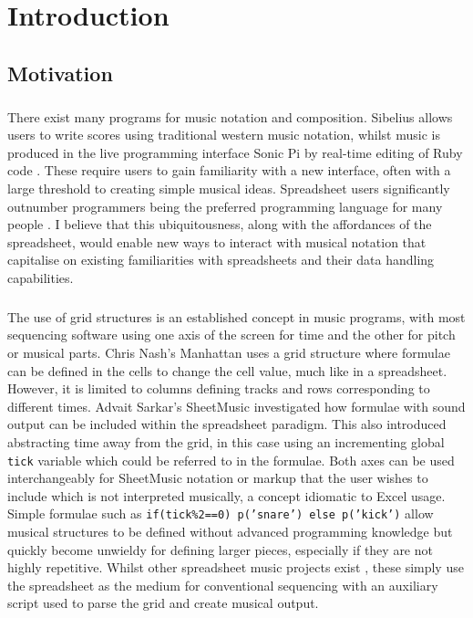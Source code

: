 
\chapter{Introduction}

\section{Motivation}

\paragraph{} There exist many programs for music notation and composition. Sibelius allows users to write scores using traditional western music notation, whilst music is produced in the live programming interface Sonic Pi by real-time editing of Ruby code \cite{aaron:pi}. These require users to gain familiarity with a new interface, often with a large threshold to creating simple musical ideas. Spreadsheet users significantly outnumber programmers \cite{scaffidi:estimating} being the preferred programming language for many people \cite{blackwell:functions}. I believe that this ubiquitousness, along with the affordances of the spreadsheet, would enable new ways to interact with musical notation that capitalise on existing familiarities with spreadsheets and their data handling capabilities.

\paragraph{} The use of grid structures is an established concept in music programs, with most sequencing software using one axis of the screen for time and the other for pitch or musical parts. Chris Nash's Manhattan \cite{nash:manhattan} uses a grid structure where formulae can be defined in the cells to change the cell value, much like in a spreadsheet. However, it is limited to columns defining tracks and rows corresponding to different times. Advait Sarkar's SheetMusic \cite{sarkar:sheetmusic} investigated how formulae with sound output can be included within the spreadsheet paradigm. This also introduced abstracting time away from the grid, in this case using an incrementing global \texttt{tick} variable which could be referred to in the formulae. Both axes can be used interchangeably for SheetMusic notation or markup that the user wishes to include which is not interpreted musically, a concept idiomatic to Excel usage. Simple formulae such as \texttt{if(tick\%2==0) p('snare') else p('kick')} allow musical structures to be defined without advanced programming knowledge but quickly become unwieldy for defining larger pieces, especially if they are not highly repetitive. Whilst other spreadsheet music projects exist \cite{hackaday:spreadsheet}, these simply use the spreadsheet as the medium for conventional sequencing with an auxiliary script used to parse the grid and create musical output.

